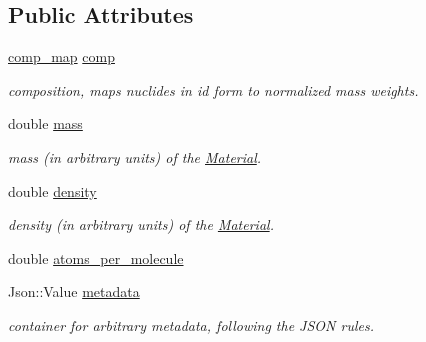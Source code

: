 \subsection*{Public Attributes}
\begin{DoxyCompactItemize}
\item 
\mbox{\label{classpyne_1_1_material_a2b0e850a66f2b8cb2b106307a00a18ed}} 
\hyperlink{namespacepyne_a86738cecccf4ce3f4ecc2ff6f45ce1a2}{comp\+\_\+map} \hyperlink{classpyne_1_1_material_a2b0e850a66f2b8cb2b106307a00a18ed}{comp}
\begin{DoxyCompactList}\small\item\em composition, maps nuclides in id form to normalized mass weights. \end{DoxyCompactList}\item 
\mbox{\label{classpyne_1_1_material_a729ebba0be2879f26f1fcf3b100d3b5d}} 
double \hyperlink{classpyne_1_1_material_a729ebba0be2879f26f1fcf3b100d3b5d}{mass}
\begin{DoxyCompactList}\small\item\em mass (in arbitrary units) of the \hyperlink{classpyne_1_1_material}{Material}. \end{DoxyCompactList}\item 
\mbox{\label{classpyne_1_1_material_a916eb7ed0143844a505c454d47755ab0}} 
double \hyperlink{classpyne_1_1_material_a916eb7ed0143844a505c454d47755ab0}{density}
\begin{DoxyCompactList}\small\item\em density (in arbitrary units) of the \hyperlink{classpyne_1_1_material}{Material}. \end{DoxyCompactList}\item 
double \hyperlink{classpyne_1_1_material_a7ddff1aaebc94bcda22d3422c093a756}{atoms\+\_\+per\+\_\+molecule}
\item 
\mbox{\label{classpyne_1_1_material_aee299ae39a32a7ff98e14c2aa3eabe32}} 
Json\+::\+Value \hyperlink{classpyne_1_1_material_aee299ae39a32a7ff98e14c2aa3eabe32}{metadata}
\begin{DoxyCompactList}\small\item\em container for arbitrary metadata, following the J\+S\+ON rules. \end{DoxyCompactList}\end{DoxyCompactItemize}
